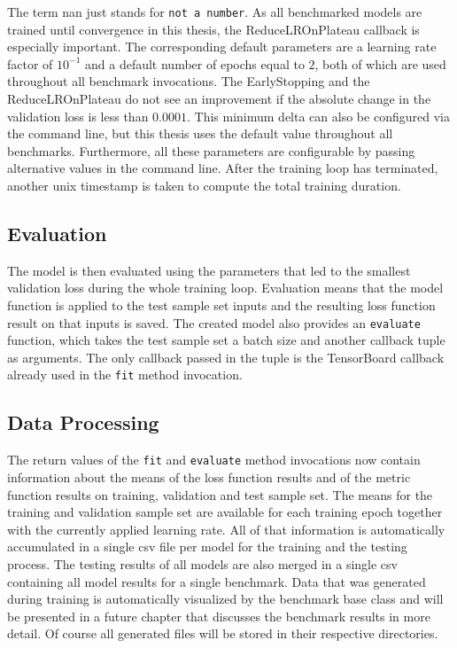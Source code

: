 \documentclass[draft,final]{vutinfth} %
\begin{document}
    The term nan just stands for \texttt{not a number}.
    As all benchmarked models are trained until convergence in this thesis, the ReduceLROnPlateau callback is especially important.
    The corresponding default parameters are a learning rate factor of $10^{-1}$ and a default number of epochs equal to $2$, both of which are used throughout all benchmark invocations.
    The EarlyStopping and the ReduceLROnPlateau do not see an improvement if the absolute change in the validation loss is less than $0.0001$.
    This minimum delta can also be configured via the command line, but this thesis uses the default value throughout all benchmarks.
    Furthermore, all these parameters are configurable by passing alternative values in the command line.
    After the training loop has terminated, another unix timestamp is taken to compute the total training duration.
    \subsection{Evaluation}
    The model is then evaluated using the parameters that led to the smallest validation loss during the whole training loop.
    Evaluation means that the model function is applied to the test sample set inputs and the resulting loss function result on that inputs is saved.
    The created model also provides an \texttt{evaluate} function, which takes the test sample set a batch size and another callback tuple as arguments.
    The only callback passed in the tuple is the TensorBoard callback already used in the \texttt{fit} method invocation.
    \subsection{Data Processing}
    The return values of the \texttt{fit} and \texttt{evaluate} method invocations now contain information about the means of the loss function results and of the metric function results on training, validation and test sample set.
    The means for the training and validation sample set are available for each training epoch together with the currently applied learning rate.
    All of that information is automatically accumulated in a single csv file per model for the training and the testing process. 
    The testing results of all models are also merged in a single csv containing all model results for a single benchmark.
    Data that was generated during training is automatically visualized by the benchmark base class and will be presented in a future chapter that discusses the benchmark results in more detail.
    Of course all generated files will be stored in their respective directories.
\end{document}
